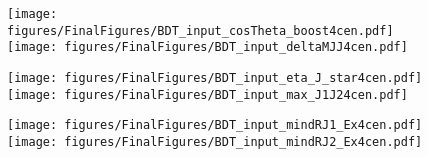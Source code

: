 \documentclass[PAPER, american,coverpage,texlive=2016, english]{\ATLASLATEXPATH atlasdoc}
\providecommand{\DIFaddbeginFL}{} %
\providecommand{\DIFaddendFL}{} %
\providecommand{\DIFdelbeginFL}{} %
\providecommand{\DIFdelendFL}{} %
\begin{document}
\begin{figure}[htbp]
  \centering

  \DIFdelbeginFL %
\DIFdelendFL \DIFaddbeginFL \texttt{[image: figures/FinalFigures/BDT\_input\_cosTheta\_boost4cen.pdf]}
  \texttt{[image: figures/FinalFigures/BDT\_input\_deltaMJJ4cen.pdf]}

\DIFaddendFL 

  \DIFdelbeginFL %
\DIFdelendFL \DIFaddbeginFL \texttt{[image: figures/FinalFigures/BDT\_input\_eta\_J\_star4cen.pdf]}
  \texttt{[image: figures/FinalFigures/BDT\_input\_max\_J1J24cen.pdf]}

\DIFaddendFL 

  \DIFdelbeginFL %
\DIFdelendFL \DIFaddbeginFL \texttt{[image: figures/FinalFigures/BDT\_input\_mindRJ1\_Ex4cen.pdf]}
  \texttt{[image: figures/FinalFigures/BDT\_input\_mindRJ2\_Ex4cen.pdf]}

\DIFaddendFL 


\end{figure}
\end{document}
